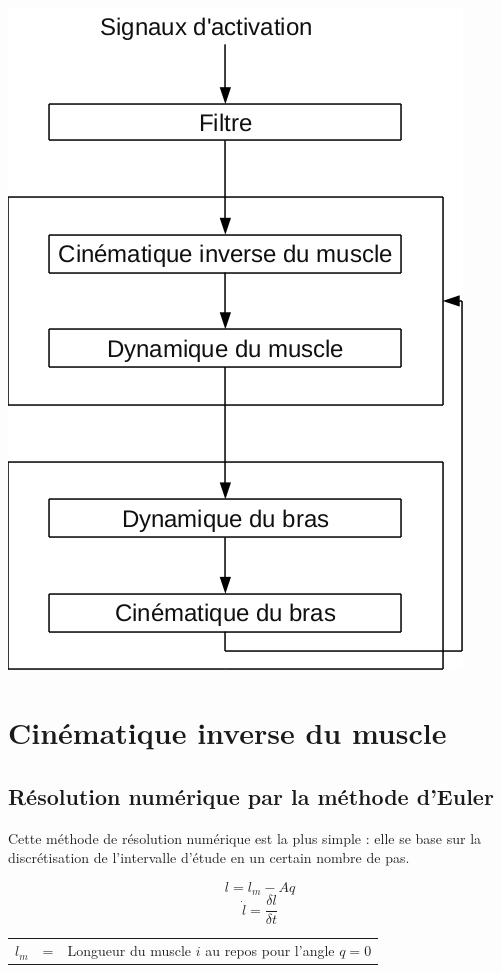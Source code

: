 \documentclass[pdftex,a4paper,11pt]{article}
\numberwithin{equation}{subsection}
\begin{document}
\paragraph{}
\begin{center}
        \includegraphics[width=.60\linewidth]{fig/modules}
\end{center}


\section{Cinématique inverse du muscle}

\subsection{Résolution numérique par la méthode d'Euler}

Cette méthode de résolution numérique est la plus simple : elle se base sur la discrétisation de l'intervalle d'étude en un certain nombre de pas.

\[l = l_m - A q\]
\[\dot{l} = \frac{\delta l}{\delta t}\]

\begin{tabular}{lcl}
    $l_{m}$   & = & Longueur du muscle $i$ au repos pour l'angle $q = 0$ \\
\end{tabular}
    
\end{document}
